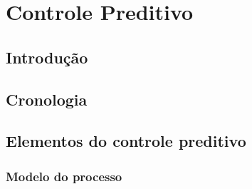 \chapter{Controle Preditivo}
\label{ch:controle_preditivo}

\section{Introdução}



\section{Cronologia}
\label{sec:cronologia}


\section{Elementos do controle preditivo}
\label{sec:elementos_do_controle_preditivo}


\subsection{Modelo do processo}
\label{subsec:modelo_do_processo}

